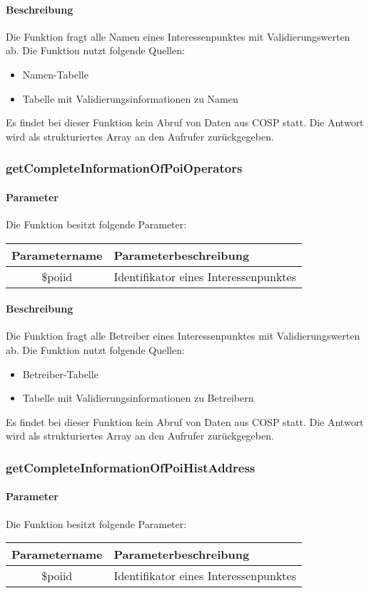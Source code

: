 \paragraph{Beschreibung} Die Funktion fragt alle Namen eines Interessenpunktes mit Validierungswerten ab. Die Funktion nutzt folgende Quellen:
\begin{itemize}
	\item Namen-Tabelle
	\item Tabelle mit Validierungsinformationen zu Namen
\end{itemize}
Es findet bei dieser Funktion kein Abruf von Daten aus {\glqq COSP\grqq} statt. Die Antwort wird als strukturiertes Array an den Aufrufer zurückgegeben.
\subsubsection{getCompleteInformationOfPoiOperators}
\paragraph{Parameter} Die Funktion besitzt folgende Parameter:
\begin{table}[H]
	\begin{tabular}{|c|p{11cm}|}
		\hline
		\textbf{Parametername} & \textbf{Parameterbeschreibung} \\ \hline
		\$poiid      & Identifikator eines Interessenpunktes \\ \hline
	\end{tabular}
\end{table}
\paragraph{Beschreibung} Die Funktion fragt alle Betreiber eines Interessenpunktes mit Validierungswerten ab. Die Funktion nutzt folgende Quellen:
\begin{itemize}
	\item Betreiber-Tabelle
	\item Tabelle mit Validierungsinformationen zu Betreibern
\end{itemize}
Es findet bei dieser Funktion kein Abruf von Daten aus {\glqq COSP\grqq} statt. Die Antwort wird als strukturiertes Array an den Aufrufer zurückgegeben.
\subsubsection{getCompleteInformationOfPoiHistAddress}
\paragraph{Parameter} Die Funktion besitzt folgende Parameter:
\begin{table}[H]
	\begin{tabular}{|c|p{11cm}|}
		\hline
		\textbf{Parametername} & \textbf{Parameterbeschreibung} \\ \hline
		\$poiid      & Identifikator eines Interessenpunktes \\ \hline
	\end{tabular}
\end{table}
